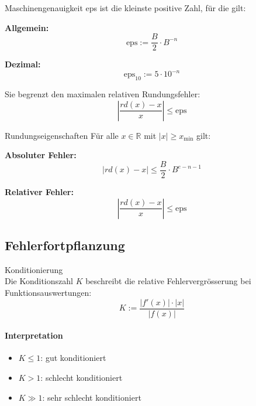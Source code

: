 \begin{lemma}{Maschinengenauigkeit} 
    eps ist die kleinste positive Zahl, für die gilt:
    \vspace{1mm}\\
\begin{minipage}[t]{0.45\textwidth}
    \textbf{Allgemein:}  $$\text{eps} := \frac{B}{2} \cdot B^{-n}$$
\end{minipage}
\begin{minipage}[t]{0.5\textwidth}
    \textbf{Dezimal:}  $$\text{eps}_{10} := 5 \cdot 10^{-n}$$
\end{minipage}

Sie begrenzt den maximalen relativen Rundungsfehler:
$$\left|\frac{rd(x)-x}{x}\right| \leq \text{eps}$$
\end{lemma}

\begin{corollary}{Rundungseigenschaften}
Für alle $x \in \mathbb{R}$ mit $|x| \geq x_{\text{min}}$ gilt:
\vspace{1mm}\\
\begin{minipage}[t]{0.45\textwidth}
    \textbf{Absoluter Fehler:}  $$|rd(x) - x| \leq \frac{B}{2} \cdot B^{e-n-1}$$
\end{minipage}
\hspace{3mm}
\begin{minipage}[t]{0.35\textwidth}
    \textbf{Relativer Fehler:}  $$\left|\frac{rd(x)-x}{x}\right| \leq \text{eps}$$
\end{minipage}
\end{corollary}

\subsection{Fehlerfortpflanzung}

\begin{concept}{Konditionierung}\\
Die Konditionszahl $K$ beschreibt die relative Fehlervergrösserung bei Funktionsauswertungen:
$$K := \frac{|f'(x)| \cdot |x|}{|f(x)|}$$

\paragraph{Interpretation}
\begin{itemize}
    \item $K \leq 1$: gut konditioniert
    \item $K > 1$: schlecht konditioniert
    \item $K \gg 1$: sehr schlecht konditioniert
\end{itemize}
\end{concept}

